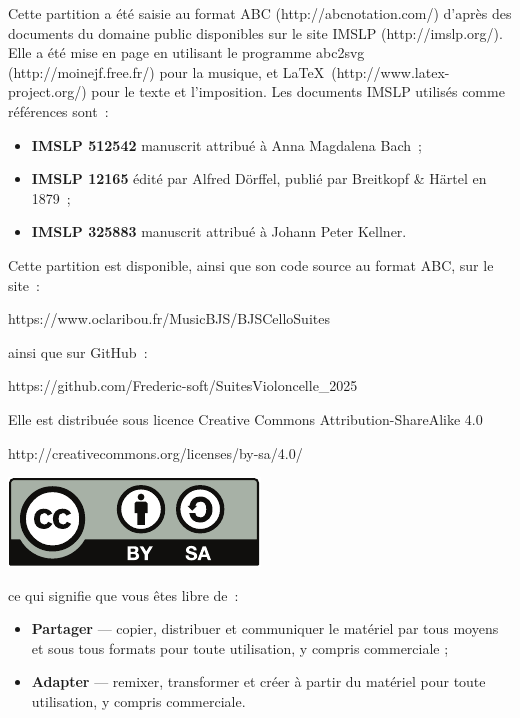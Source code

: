 \documentclass[a4paper,twoside]{article}
\renewenvironment{quote}{%
  \list{}{%
    \leftmargin=0.5cm   %
    \rightmargin=\leftmargin
  }%
  \item\relax
}{\endlist}
\newcommand{\includerh}[3][0pt]{%
  \raisebox{#1}{\texttt{[image: \#3]}}%
}
\begin{document}
\vspace*{0pt plus 1 fill}
\normalsize
Cette partition a été saisie au format ABC (http://abcnotation.com/) d'après des documents du 
domaine public disponibles sur le site IMSLP (http://imslp.org/). Elle a été mise en page en 
utilisant le programme abc2svg (http://moinejf.free.fr/) pour la musique, 
et \LaTeX\ (http://www.latex-project.org/) pour le texte et l'imposition.
Les documents IMSLP utilisés comme références sont~:
\begin{quote}
\begin{itemize}
  \item[] \textbf{IMSLP 512542} manuscrit attribué à Anna Magdalena Bach~;
  
  \item[] \textbf{IMSLP 12165} édité par Alfred Dörffel, publié par Breitkopf \& Härtel en 1879~;
  
  \item[] \textbf{IMSLP 325883} manuscrit attribué à Johann Peter Kellner.
\end{itemize}
\end{quote}

\bigskip

Cette partition est disponible, ainsi que son code source au format ABC, sur le site~:

\smallskip

\centerline{https://www.oclaribou.fr/MusicBJS/BJSCelloSuites}

ainsi que sur GitHub~:

\smallskip

\centerline{https://github.com/Frederic-soft/SuitesVioloncelle\_2025}

\bigskip

Elle est distribuée sous licence Creative Commons Attribution-ShareAlike 4.0

\centerline{http://creativecommons.org/licenses/by-sa/4.0/}

\medskip

\centerline{\includegraphics{inc/by-sa}}

\medskip

ce qui signifie que vous êtes libre de~:
\begin{quote}
\begin{itemize}
  \item[{\includerh[-2ex]{5ex}{inc/share}}] \textbf{Partager} --- copier, distribuer 
  et communiquer le matériel par tous moyens et sous tous formats pour toute utilisation, 
  y compris commerciale ;
  
  \item[{\includerh[-2ex]{5ex}{inc/remix}}] \textbf{Adapter} --- remixer, transformer et 
  créer à partir du matériel pour toute utilisation, y compris commerciale.
\end{itemize}
\end{quote}
\end{document}
